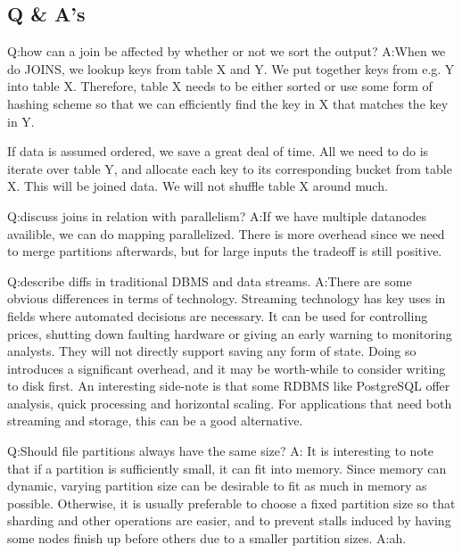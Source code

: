 \subsection{Q & A's}


Q:\@ how can a join be affected by whether or not we sort the output?
\newline A:\@ When we do JOINS, we lookup keys from table X and Y. We put together keys from e.g. Y into table X. Therefore, table X needs to be either sorted or use some form of hashing scheme so that we can efficiently find the key in X that matches the key in Y.

If data is assumed ordered, we save a great deal of time. All we need to do is iterate over table Y, and allocate each key to its corresponding bucket from table X. This will be joined data. We will not shuffle table X around much.  

Q:\@ discuss joins in relation with parallelism?
\newline A:\@ If we have multiple datanodes availible, we can do mapping 
parallelized. There is more overhead since we need to merge partitions afterwards,
but for large inputs the tradeoff is still positive.

Q:\@ describe diffs in traditional DBMS and data streams.
\newline A:\@ There are some obvious differences in terms of technology. Streaming technology has key uses 
in fields where automated decisions are necessary. It can be used for controlling prices, 
shutting down faulting hardware or giving an early warning to monitoring analysts.
They will not directly  support saving any form of state. Doing so introduces a significant overhead,
and it may be worth-while to consider writing to disk first. 
An interesting side-note is that some RDBMS like PostgreSQL offer  analysis, quick processing and horizontal scaling. For applications that need both streaming and storage, this can
be a good alternative.

Q:\@ Should file partitions always have the same size?
A:\@
It is interesting to note that if a partition is sufficiently small, it can fit into memory.
Since memory can dynamic, varying partition size can be desirable to fit as much in memory as possible.
Otherwise, it is usually preferable to choose a fixed partition size so that sharding and 
other operations are easier, and to prevent stalls induced by having some nodes finish up
before others due to a smaller partition sizes.
\newline A:\@ ah.

